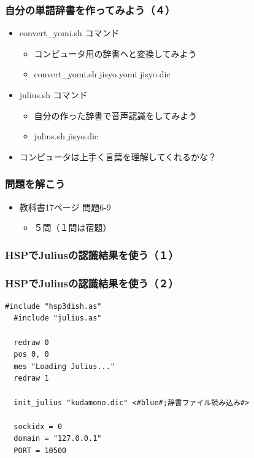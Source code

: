 \documentclass[14pt]{beamer}
\begin{document}
\begin{frame}
  \frametitle{自分の単語辞書を作ってみよう（４）}
  \begin{itemize}
    \item convert\_yomi.sh コマンド
          \begin{itemize}
            \item コンピュータ用の辞書へと変換してみよう
            \item convert\_yomi.sh jisyo.yomi  jisyo.dic
          \end{itemize}
    \item julius.sh コマンド
          \begin{itemize}
            \item 自分の作った辞書で音声認識をしてみよう
            \item julius.sh jisyo.dic
          \end{itemize}
    \item コンピュータは上手く言葉を理解してくれるかな？
  \end{itemize}
\end{frame}

\begin{frame}
  \frametitle{問題を解こう}
  \begin{itemize}
    \item 教科書17ページ 問題6-9
          \begin{itemize}
            \item ５問（１問は宿題）
          \end{itemize}
  \end{itemize}
\end{frame}

\begin{frame}
  \frametitle{HSPでJuliusの認識結果を使う（１）}
  \begin{figure}
    
  \end{figure}
\end{frame}

\begin{frame}[fragile]
  \frametitle{HSPでJuliusの認識結果を使う（２）}
  \begin{lstlisting}[caption=julius.hsp,label=julius.hsp]
  #include "hsp3dish.as"
  #include "julius.as"

  redraw 0
  pos 0, 0
  mes "Loading Julius..."
  redraw 1

  init_julius "kudamono.dic" <#blue#;辞書ファイル読み込み#>

  sockidx = 0
  domain = "127.0.0.1"
  PORT = 10500
  \end{lstlisting}
\end{frame}
\end{document}
